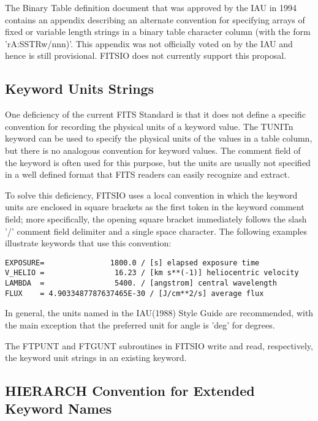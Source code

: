 \documentclass[11pt]{book}
\begin{document}
The Binary Table definition document that was approved by the IAU in
1994 contains an appendix describing an alternate convention for
specifying arrays of fixed or variable length strings in a binary table
character column (with the form 'rA:SSTRw/nnn)'.  This appendix was not
officially voted on by the IAU and hence is still provisional.  FITSIO
does not currently support this proposal.


\subsection{Keyword Units Strings}

One deficiency of the current FITS Standard is that it does not define
a specific convention for recording the physical units of a keyword
value.  The TUNITn keyword can be used to specify the physical units of
the values in a table column, but there is no analogous convention for
keyword values.  The comment field of the keyword is often used for
this purpose, but the units are usually not specified in a well defined
format that FITS readers can easily recognize and extract.

To solve this deficiency, FITSIO uses a local convention in which the
keyword units are enclosed in square brackets as the first token in the
keyword comment field; more specifically, the opening square bracket
immediately follows the slash '/' comment field delimiter and a single
space character.  The following examples illustrate keywords that use
this convention:


\begin{verbatim}
EXPOSURE=               1800.0 / [s] elapsed exposure time
V_HELIO =                16.23 / [km s**(-1)] heliocentric velocity
LAMBDA  =                5400. / [angstrom] central wavelength
FLUX    = 4.9033487787637465E-30 / [J/cm**2/s] average flux
\end{verbatim}

In general, the units named in the IAU(1988) Style Guide are
recommended, with the main exception that the preferred unit for angle
is 'deg' for degrees.

The FTPUNT and FTGUNT subroutines in FITSIO write and read,
respectively, the keyword unit strings in an existing keyword.


\subsection{HIERARCH Convention for Extended Keyword Names}
\end{document}
